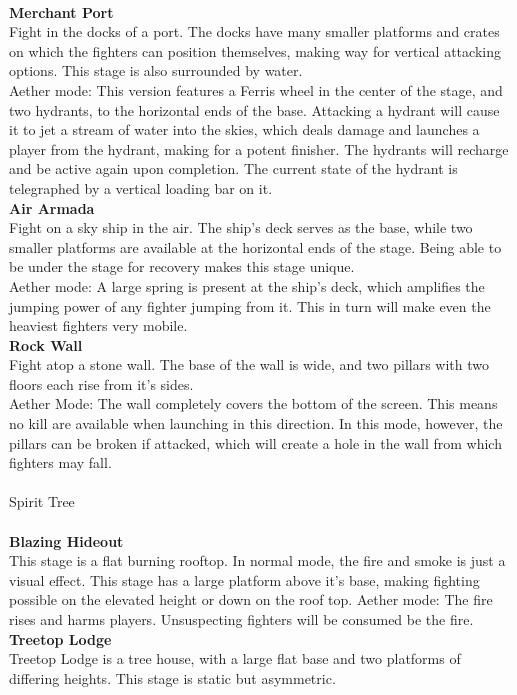 \documentclass[11pt]{article}
\begin{document}
\\
\textbf{Merchant Port}\\
Fight in the docks of a port. The docks have many smaller platforms and crates on which the fighters can position themselves, making way for vertical attacking options. This stage is also surrounded by water.\\
Aether mode: This version features a Ferris wheel in the center of the stage, and two hydrants, to the horizontal ends of the base. Attacking a hydrant will cause it to jet a stream of water into the skies, which deals damage and launches a player from the hydrant, making for a potent finisher. The hydrants will recharge and be active again upon completion. The current state of the hydrant is telegraphed by a vertical loading bar on it.
\\
\textbf{Air Armada}\\
Fight on a sky ship in the air. The ship's deck serves as the base, while two smaller platforms are available at the horizontal ends of the stage. Being able to be under the stage for recovery makes this stage unique.\\
Aether mode: A large spring is present at the ship's deck, which amplifies the jumping power of any fighter jumping from it. This in turn will make even the heaviest fighters very mobile.
\\
\textbf{Rock Wall}\\
Fight atop a stone wall. The base of the wall is wide, and two pillars with two floors each rise from it's sides.\\
Aether Mode: The wall completely covers the bottom of the screen. This means no kill are available when launching in this direction. In this mode, however, the pillars can be broken if attacked, which will create a hole in the wall from which fighters may fall.\\
\\
Spirit Tree\\%
\\
\textbf{Blazing Hideout}\\
This stage is a flat burning rooftop. In normal mode, the fire and smoke is just a visual effect. This stage has a large platform above it's base, making fighting possible on the elevated height or down on the roof top.
Aether mode: The fire rises and harms players. Unsuspecting fighters will be consumed be the fire.
\\
\textbf{Treetop Lodge}\\
Treetop Lodge is a tree house, with a large flat base and two platforms of differing heights. This stage is static but asymmetric.
\end{document}
